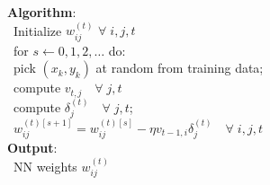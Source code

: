 \documentclass[12pt]{report}
\theoremstyle{plain}
\begin{document}
\begin{flushleft}
\begin{tcolorbox}
	\textbf{Algorithm}:\\
	\-\ \quad Initialize $w_{ij}^{(t)}$ $\forall\; i,j,t$\\
	\-\ \quad for $s\leftarrow 0,1,2,\dots$ do: \hfill{}\\
	\-\ \quad\qquad pick $(x_k,y_k)$ at random from training data;\hfill{}\\
	\-\ \quad\qquad compute $v_{t,j}\quad\forall\;j,t$\hfill{}\\
	\-\ \quad\qquad compute $\delta_j^{(t)}\quad\forall\; j,t$;\hfill{}\\
	\-\ \quad\qquad $w_{ij}^{(t)[s+1]} = w_{ij}^{(t)[s]}-\eta v_{t-1,i}\delta_j^{(t)}\quad\forall\; i,j,t$\hfill{}\\
	
	\textbf{Output}:\\
	\-\ \quad NN weights $w_{ij}^{(t)}$\\
	

\end{tcolorbox}
\end{flushleft}
\end{document}
